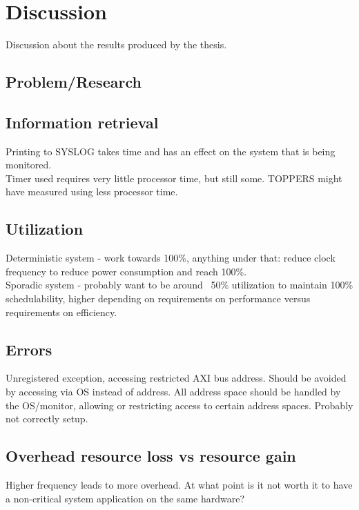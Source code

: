 \chapter{Discussion}
Discussion about the results produced by the thesis.

\section{Problem/Research}

\section{Information retrieval}
Printing to SYSLOG takes time and has an effect on the system that is being monitored.\\

Timer used requires very little processor time, but still some. TOPPERS might have measured using less processor time.

\section{Utilization}
Deterministic system - work towards 100\%, anything under that: reduce clock frequency to reduce power consumption and reach 100\%.\\

Sporadic system - probably want to be around ~50\% utilization to maintain 100\% schedulability, higher depending on requirements on performance versus requirements on efficiency.

\section{Errors}
Unregistered exception, accessing restricted AXI bus address. Should be avoided by accessing via OS instead of address. All address space should be handled by the OS/monitor, allowing or restricting access to certain address spaces. Probably not correctly setup.

\section{Overhead resource loss vs resource gain}
Higher frequency leads to more overhead. At what point is it not worth it to have a non-critical system application on the same hardware?
